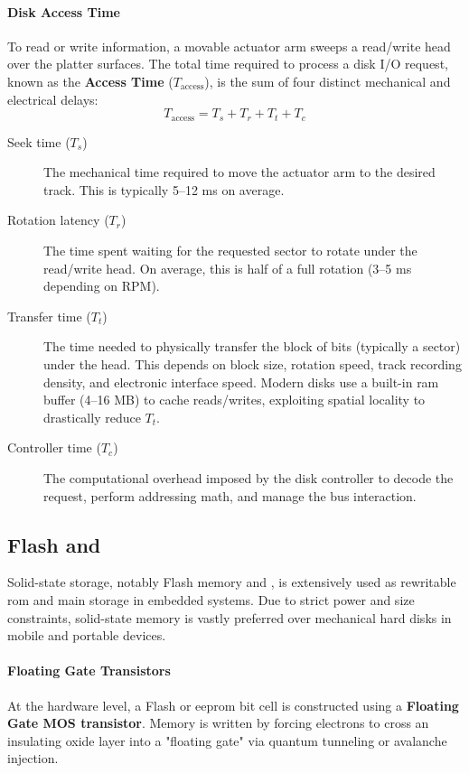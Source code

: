 \paragraph{Disk Access Time}
To read or write information, a movable actuator arm sweeps a read/write head over the platter surfaces. The total time required to process a disk I/O request, known as the \textbf{Access Time} ($T_{\text{access}}$), is the sum of four distinct mechanical and electrical delays:
\[T_{\text{access}} = T_s + T_r + T_t + T_c\]

\begin{description}
    \item[Seek time ($T_s$)] The mechanical time required to move the actuator arm to the desired track. This is typically 5--12 ms on average.
    \item[Rotation latency ($T_r$)] The time spent waiting for the requested sector to rotate under the read/write head. On average, this is half of a full rotation (3--5 ms depending on RPM).
    \item[Transfer time ($T_t$)] The time needed to physically transfer the block of bits (typically a sector) under the head. This depends on block size, rotation speed, track recording density, and electronic interface speed. Modern disks use a built-in \gls{ram} buffer (4--16 MB) to cache reads/writes, exploiting spatial locality to drastically reduce $T_t$.
    \item[Controller time ($T_c$)] The computational overhead imposed by the disk controller to decode the request, perform addressing math, and manage the bus interaction.
\end{description}


\subsection{Flash  and }
Solid-state storage, notably Flash memory and , is extensively used as rewritable \gls{rom} and main storage in embedded systems. Due to strict power and size constraints, solid-state memory is vastly preferred over mechanical hard disks in mobile and portable devices.

\paragraph{Floating Gate Transistors}
At the hardware level, a Flash or \gls{eeprom} bit cell is constructed using a \textbf{Floating Gate MOS transistor}. Memory is written by forcing electrons to cross an insulating oxide layer into a "floating gate" via quantum tunneling or avalanche injection. 


